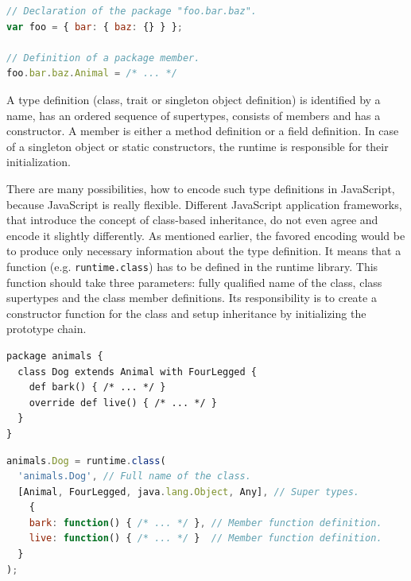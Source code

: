 \documentclass[12pt,a4paper]{report}
\begin{document}
\begin{minipage}{\linewidth}
\begin{lstlisting}[language=JavaScript,caption={Packages in JavaScript.},label={lst:JavaScriptPackages}]
// Declaration of the package "foo.bar.baz".
var foo = { bar: { baz: {} } };

// Definition of a package member.
foo.bar.baz.Animal = /* ... */
\end{lstlisting}
\end{minipage}

A type definition (class, trait or singleton object definition) is identified by a name, has an ordered sequence of supertypes, consists of members and has a constructor. A member is either a method definition or a field definition. In case of a singleton object or static constructors, the runtime is responsible for their initialization.

There are many possibilities, how to encode such type definitions in JavaScript, because JavaScript is really flexible. Different JavaScript application frameworks, that introduce the concept of class-based inheritance, do not even agree and encode it slightly differently. As mentioned earlier, the favored encoding would be to produce only necessary information about the type definition. It means that a function (e.g. \texttt{runtime.class}) has to be defined in the runtime library. This function should take three parameters: fully qualified name of the class, class supertypes and the class member definitions. Its responsibility is to create a constructor function for the class and setup inheritance by initializing the prototype chain. 

\begin{minipage}{\linewidth}
\begin{lstlisting}[caption={Scala \texttt{Dog} class example.},label={lst:ScalaClassEncoding}]
package animals {
  class Dog extends Animal with FourLegged {
    def bark() { /* ... */ }
    override def live() { /* ... */ }
  }
}
\end{lstlisting}
\end{minipage}

\begin{minipage}{\linewidth}
\begin{lstlisting}[language=JavaScript,caption={The \texttt{Dog} class encoded using the \texttt{runtime.class} function},label={lst:JavaScriptClassEncoding}]
animals.Dog = runtime.class(
  'animals.Dog', // Full name of the class.                              
  [Animal, FourLegged, java.lang.Object, Any], // Super types.
	{
    bark: function() { /* ... */ }, // Member function definition.
    live: function() { /* ... */ }  // Member function definition.
  }
);
\end{lstlisting}
\end{minipage}
\end{document}
